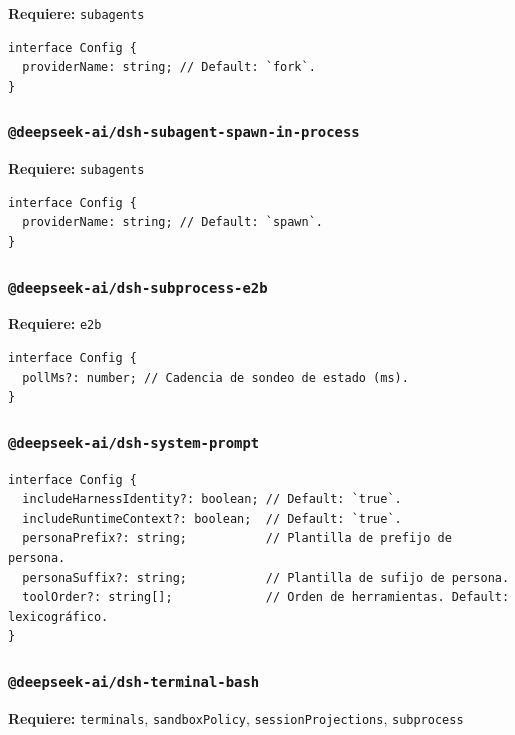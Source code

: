 \documentclass[11pt,a4paper]{article}
\begin{document}
\textbf{Requiere:} \texttt{subagents}


\begin{lstlisting}
interface Config {
  providerName: string; // Default: `fork`.
}
\end{lstlisting}


\subsubsection*{\texttt{@deepseek-ai/dsh-subagent-spawn-in-process}}


\textbf{Requiere:} \texttt{subagents}


\begin{lstlisting}
interface Config {
  providerName: string; // Default: `spawn`.
}
\end{lstlisting}


\subsubsection*{\texttt{@deepseek-ai/dsh-subprocess-e2b}}


\textbf{Requiere:} \texttt{e2b}


\begin{lstlisting}
interface Config {
  pollMs?: number; // Cadencia de sondeo de estado (ms).
}
\end{lstlisting}


\subsubsection*{\texttt{@deepseek-ai/dsh-system-prompt}}


\begin{lstlisting}
interface Config {
  includeHarnessIdentity?: boolean; // Default: `true`.
  includeRuntimeContext?: boolean;  // Default: `true`.
  personaPrefix?: string;           // Plantilla de prefijo de persona.
  personaSuffix?: string;           // Plantilla de sufijo de persona.
  toolOrder?: string[];             // Orden de herramientas. Default: lexicográfico.
}
\end{lstlisting}


\subsubsection*{\texttt{@deepseek-ai/dsh-terminal-bash}}


\textbf{Requiere:} \texttt{terminals}, \texttt{sandboxPolicy}, \texttt{sessionProjections}, \texttt{subprocess}
\end{document}
